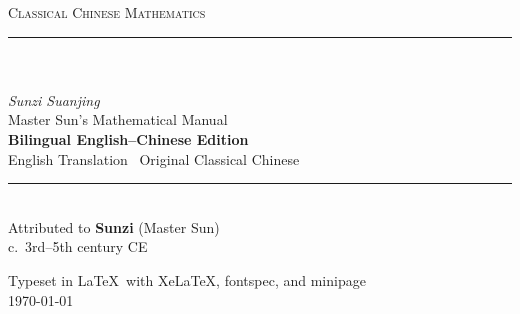 \documentclass[11pt,a4paper]{article}
\newcommand{\longline}{\noindent\rule{\textwidth}{0.4pt}}
\begin{document}
\begin{titlepage}
\begin{center}
\vspace*{1.5cm}

{\fontsize{12}{14}\selectfont\textsc{Classical Chinese Mathematics}}\\[0.5cm]

\longline\\[0.8cm]

{\fontsize{32}{38}\selectfont\bfseries\color{titlecolor}}\\[0.5cm]

{\fontsize{20}{24}\selectfont\itshape Sunzi Suanjing}\\[0.3cm]

{\fontsize{14}{18}\selectfont Master Sun's Mathematical Manual}\\[0.8cm]

{\large\textbf{Bilingual English--Chinese Edition}}\\[0.3cm]
{\normalsize English Translation \textbullet\ Original Classical Chinese}\\[1.2cm]

\longline\\[1cm]

{\large Attributed to \textbf{Sunzi} (Master Sun)}\\[0.3cm]
{\normalsize c.\ 3rd--5th century CE}\\[1.5cm]

%

\vfill

{\small Typeset in \LaTeX\ with XeLaTeX, fontspec, and minipage}\\[0.3cm]
{\small\today}

\end{center}
\end{titlepage}

\tableofcontents
\newpage
\end{document}
